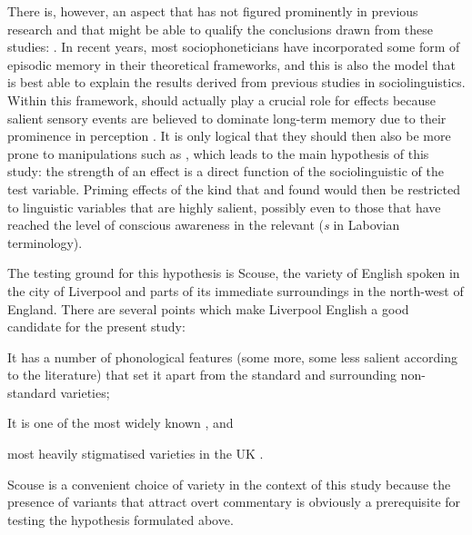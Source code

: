 There is, however, an aspect that has not figured prominently in previous research and that might be able to qualify the conclusions drawn from these studies: .
In recent years, most sociophoneticians have incorporated some form of episodic memory in their theoretical frameworks, and this is also the model that is best able to explain the results derived from previous  studies in sociolinguistics.
Within this framework,  should actually play a crucial role for  effects because salient sensory events are believed to dominate long-term memory due to their prominence in perception \parencite[cf.][]{pierrehumbert2006}.
It is only logical that they should then also be more prone to manipulations such as , which leads to the main hypothesis of this study: the strength of an   effect is a direct function of the sociolinguistic  of the test variable.
Priming effects of the kind that \textcite{niedzielski1999} and \textcite{hayetal2006a} found would then be restricted to linguistic variables that are highly salient, possibly even to those that have reached the level of conscious awareness in the relevant  (\emph{s} in Labovian terminology).

The testing ground for this hypothesis is Scouse, the variety of English spoken in the city of Liverpool and parts of its immediate surroundings in the north-west of England.
There are several points which make Liverpool English a good candidate for the present study:
\begin{inparaenum}[(1)]
	\item It has a number of phonological features (some more, some less salient according to the literature) that set it apart from the standard and surrounding non-standard varieties;
	\item It is one of the most widely known \parencite[cf.][]{trudgill1999}, and
	\item most heavily stigmatised varieties in the UK \parencite[cf.][]{montgomery2007}.
\end{inparaenum}
Scouse is a convenient choice of variety in the context of this study because the presence of variants that attract overt commentary is obviously a prerequisite for testing the hypothesis formulated above.

